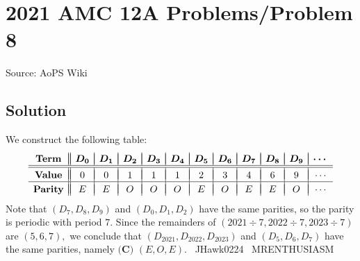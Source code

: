 \documentclass[12pt]{article}
\begin{document}
\section*{{2021 AMC 12A Problems/Problem 8}}
Source: AoPS Wiki

\subsection*{Solution}
We construct the following table: \[\begin{array}{c||c|c|c|c|c|c|c|c|c|c|c} &&&&&&&&&&& \\ [-2.5ex] \textbf{Term} &\boldsymbol{D_0}&\boldsymbol{D_1}&\boldsymbol{D_2}&\boldsymbol{D_3}&\boldsymbol{D_4}&\boldsymbol{D_5}&\boldsymbol{D_6}&\boldsymbol{D_7}&\boldsymbol{D_8}&\boldsymbol{D_9}&\boldsymbol{\cdots} \\ \hline \hline &&&&&&&&&&& \\ [-2.25ex] \textbf{Value} & 0&0&1&1&1&2&3&4&6&9&\cdots \\ \hline &&&&&&&&&&& \\ [-2.25ex] \textbf{Parity} & E&E&O&O&O&E&O&E&E&O&\cdots \end{array}\] Note that $(D_7,D_8,D_9)$ and $(D_0,D_1,D_2)$ have the same parities, so the parity is periodic with period $7.$ Since the remainders of $(2021\div7,2022\div7,2023\div7)$ are $(5,6,7),$ we conclude that $(D_{2021},D_{2022},D_{2023})$ and $(D_5,D_6,D_7)$ have the same parities, namely $\boxed{\textbf{(C) }(E,O,E)}.$ ~JHawk0224 ~MRENTHUSIASM
\end{document}
